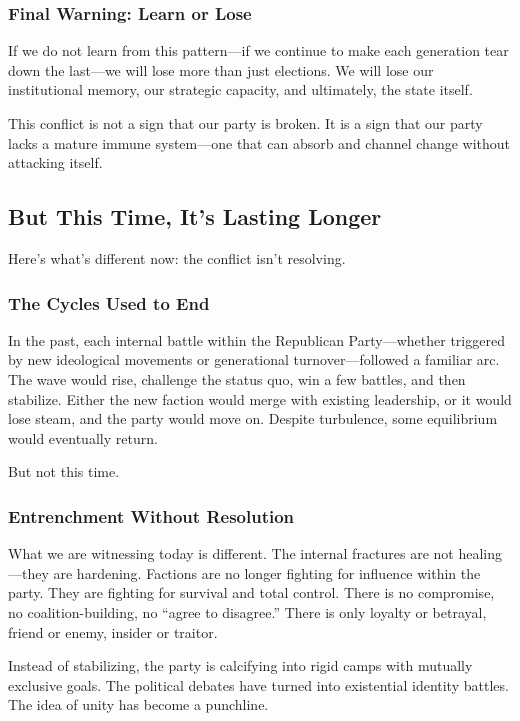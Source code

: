 \subsubsection{Final Warning: Learn or Lose}
If we do not learn from this pattern—if we continue to make each generation tear down the last—we will lose more than just elections. We will lose our institutional memory, our strategic capacity, and ultimately, the state itself.

This conflict is not a sign that our party is broken. It is a sign that our party lacks a mature immune system—one that can absorb and channel change without attacking itself.

\subsection{But This Time, It’s Lasting Longer}

Here’s what’s different now: the conflict isn’t resolving.

\subsubsection{The Cycles Used to End}
In the past, each internal battle within the Republican Party—whether triggered by new ideological movements or generational turnover—followed a familiar arc. The wave would rise, challenge the status quo, win a few battles, and then stabilize. Either the new faction would merge with existing leadership, or it would lose steam, and the party would move on. Despite turbulence, some equilibrium would eventually return.

But not this time.

\subsubsection{Entrenchment Without Resolution}
What we are witnessing today is different. The internal fractures are not healing—they are hardening. Factions are no longer fighting for influence within the party. They are fighting for survival and total control. There is no compromise, no coalition-building, no “agree to disagree.” There is only loyalty or betrayal, friend or enemy, insider or traitor.

Instead of stabilizing, the party is calcifying into rigid camps with mutually exclusive goals. The political debates have turned into existential identity battles. The idea of unity has become a punchline.

